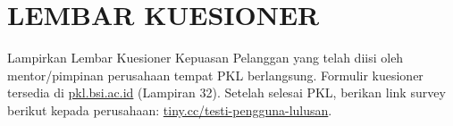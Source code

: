 \clearpage
\chapter*{LEMBAR KUESIONER}
\label{lamp:bukti-plagiarisme}

Lampirkan Lembar Kuesioner Kepuasan Pelanggan yang telah diisi oleh mentor/pimpinan perusahaan tempat PKL berlangsung. Formulir kuesioner tersedia di \href{http://pkl.bsi.ac.id}{pkl.bsi.ac.id} (Lampiran 32). Setelah selesai PKL, berikan link survey berikut kepada perusahaan: \href{http://tiny.cc/testi-pengguna-lulusan}{tiny.cc/testi-pengguna-lulusan}.

\begin{center}
\end{center}
